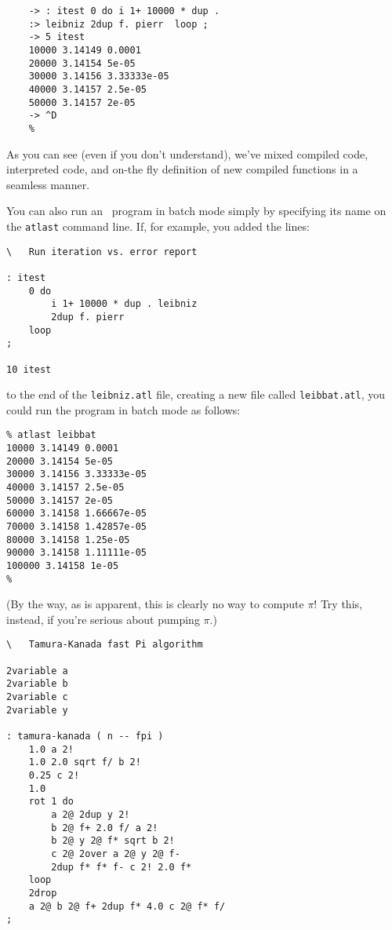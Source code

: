 \documentclass[twocolumn]{article}
\begin{document}
\begin{verbatim}
    -> : itest 0 do i 1+ 10000 * dup .
    :> leibniz 2dup f. pierr  loop ;
    -> 5 itest
    10000 3.14149 0.0001 
    20000 3.14154 5e-05 
    30000 3.14156 3.33333e-05 
    40000 3.14157 2.5e-05 
    50000 3.14157 2e-05 
    -> ^D
    %
\end{verbatim}

As you can see (even if you don't understand), we've mixed compiled
code, interpreted code, and on-the fly definition of new compiled
functions in a seamless manner.

You can also run an \atlast\ program in batch mode simply by specifying
its name on the {\tt atlast} command line.  If, for example, you added
the lines:

\begin{verbatim}
\   Run iteration vs. error report

: itest
    0 do 
        i 1+ 10000 * dup . leibniz
        2dup f. pierr
    loop
;

10 itest
\end{verbatim}

to the end of the {\tt leibniz.atl} file, creating a new file called
{\tt leibbat.atl}, you could run the program in batch mode as follows:

\begin{verbatim}
% atlast leibbat 
10000 3.14149 0.0001 
20000 3.14154 5e-05 
30000 3.14156 3.33333e-05 
40000 3.14157 2.5e-05 
50000 3.14157 2e-05 
60000 3.14158 1.66667e-05 
70000 3.14158 1.42857e-05 
80000 3.14158 1.25e-05 
90000 3.14158 1.11111e-05 
100000 3.14158 1e-05 
%
\end{verbatim}

(By the way, as is apparent, this is clearly no way to compute $\pi$!
Try this, instead, if you're serious about pumping $\pi$.)

\begin{verbatim}
\   Tamura-Kanada fast Pi algorithm

2variable a
2variable b
2variable c
2variable y

: tamura-kanada ( n -- fpi )
    1.0 a 2!
    1.0 2.0 sqrt f/ b 2!
    0.25 c 2!
    1.0
    rot 1 do
        a 2@ 2dup y 2!
        b 2@ f+ 2.0 f/ a 2!
        b 2@ y 2@ f* sqrt b 2!
        c 2@ 2over a 2@ y 2@ f-
        2dup f* f* f- c 2! 2.0 f*
    loop
    2drop
    a 2@ b 2@ f+ 2dup f* 4.0 c 2@ f* f/
;
\end{verbatim}

\newcommand{\au}[1]{{\tt atl\underline{ }#1}}
\newcommand{\AU}[1]{{\tt ATL\underline{ }#1}}
\end{document}
